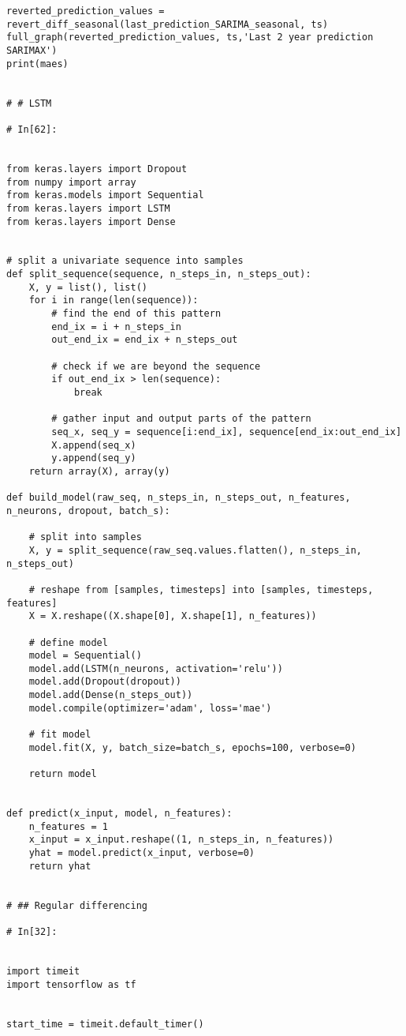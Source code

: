 \begin{verbatim}
reverted_prediction_values = revert_diff_seasonal(last_prediction_SARIMA_seasonal, ts)
full_graph(reverted_prediction_values, ts,'Last 2 year prediction SARIMAX')
print(maes)


# # LSTM

# In[62]:


from keras.layers import Dropout
from numpy import array
from keras.models import Sequential
from keras.layers import LSTM
from keras.layers import Dense


# split a univariate sequence into samples
def split_sequence(sequence, n_steps_in, n_steps_out):
    X, y = list(), list()
    for i in range(len(sequence)):
        # find the end of this pattern
        end_ix = i + n_steps_in
        out_end_ix = end_ix + n_steps_out
        
        # check if we are beyond the sequence
        if out_end_ix > len(sequence):
            break
            
        # gather input and output parts of the pattern
        seq_x, seq_y = sequence[i:end_ix], sequence[end_ix:out_end_ix]
        X.append(seq_x)
        y.append(seq_y)
    return array(X), array(y)
 
def build_model(raw_seq, n_steps_in, n_steps_out, n_features, n_neurons, dropout, batch_s):
    
    # split into samples
    X, y = split_sequence(raw_seq.values.flatten(), n_steps_in, n_steps_out)
    
    # reshape from [samples, timesteps] into [samples, timesteps, features]
    X = X.reshape((X.shape[0], X.shape[1], n_features))
    
    # define model
    model = Sequential()
    model.add(LSTM(n_neurons, activation='relu'))
    model.add(Dropout(dropout))
    model.add(Dense(n_steps_out))
    model.compile(optimizer='adam', loss='mae')
    
    # fit model
    model.fit(X, y, batch_size=batch_s, epochs=100, verbose=0)
    
    return model


def predict(x_input, model, n_features):
    n_features = 1
    x_input = x_input.reshape((1, n_steps_in, n_features))
    yhat = model.predict(x_input, verbose=0)
    return yhat


# ## Regular differencing 

# In[32]:


import timeit
import tensorflow as tf


start_time = timeit.default_timer()


\end{verbatim}
